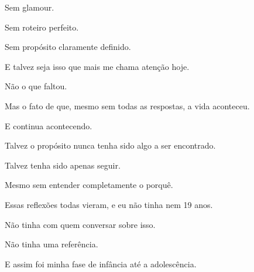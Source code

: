 Sem glamour.

Sem roteiro perfeito.

Sem propósito claramente definido.

E talvez seja isso que mais me chama atenção hoje.

Não o que faltou.

Mas o fato de que, mesmo sem todas as respostas, a vida aconteceu.

E continua acontecendo.

Talvez o propósito nunca tenha sido algo a ser encontrado.

Talvez tenha sido apenas seguir.

Mesmo sem entender completamente o porquê.

Essas reflexões todas vieram, e eu não tinha nem 19 anos.

Não tinha com quem conversar sobre isso.

Não tinha uma referência.

E assim foi minha fase de infância até a adolescência.


